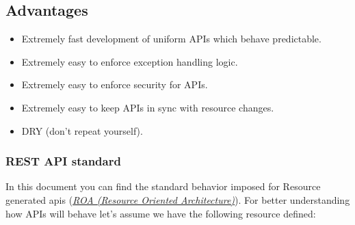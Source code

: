 \documentclass[letterpaper,10pt,english]{sphinxmanual}
\begin{document}
\subsection{Advantages}
\label{features/roa:advantages}\begin{itemize}
\item {} 
Extremely fast development of uniform APIs which behave predictable.

\item {} 
Extremely easy to enforce exception handling logic.

\item {} 
Extremely easy to enforce security for APIs.

\item {} 
Extremely easy to keep APIs in sync with resource changes.

\item {} 
DRY (don't repeat yourself).

\end{itemize}


\subsubsection{REST API standard}
\label{features/roa/rest_standard:rest-api-standard}\label{features/roa/rest_standard::doc}
In this document you can find the standard behavior imposed for Resource generated apis ({\hyperref[features/roa::doc]{\emph{ROA (Resource Oriented Architecture)}}}). For better
understanding how APIs will behave let's assume we have the following resource defined:
\end{document}

